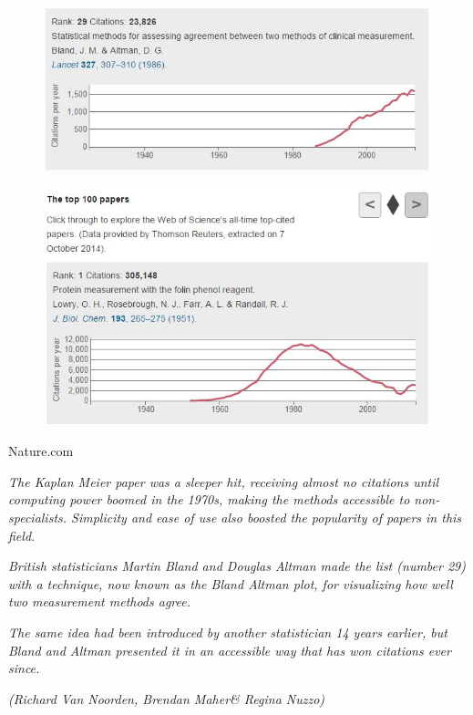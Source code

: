 \documentclass[compress]{beamer}        %
\begin{document}
		\begin{frame}
			\begin{figure}
				\centering
				\includegraphics[width=0.99\linewidth]{images/BACITE1}
				
				\label{fig:BACITE1}
			\end{figure}
			
		\end{frame}
		\begin{frame}
			\begin{figure}
\centering
\includegraphics[width=0.99\linewidth]{images/MostCited}

\end{figure}

		\end{frame}
		\begin{frame}
Nature.com
\begin{framed}
\textit{The Kaplan Meier paper was a sleeper hit, receiving almost no citations until computing power boomed in the 1970s, making the methods accessible to non-specialists. Simplicity and ease of use also boosted the popularity of papers in this field. }\\ \bigskip
	
\textit{British statisticians Martin Bland and Douglas Altman made the list (number 29) with a technique, now known as the Bland Altman plot, for visualizing how well two measurement methods agree. } \\ \bigskip
	
\textit{The same idea had been introduced by another statistician 14 years earlier, but Bland and Altman presented it in an accessible way that has won citations ever since.}
\end{framed}
\textit{(Richard Van Noorden, Brendan Maher\& Regina Nuzzo)	}		
		\end{frame}
\end{document}
